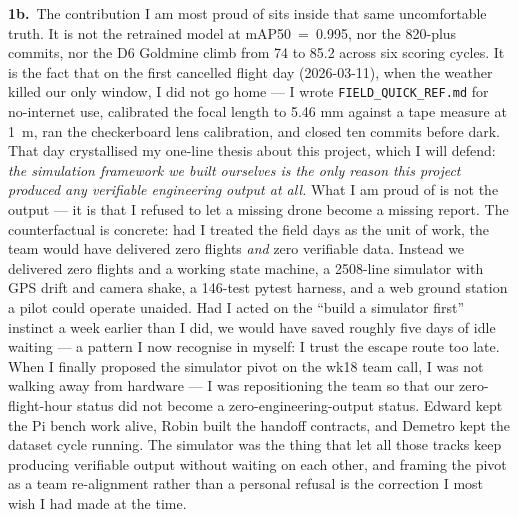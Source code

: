 \textbf{1b.}~The contribution I am most proud of sits inside that same uncomfortable truth. It is not the retrained model at mAP50~=~0.995, nor the 820-plus commits, nor the D6 Goldmine climb from 74 to 85.2 across six scoring cycles. It is the fact that on the first cancelled flight day (2026-03-11), when the weather killed our only window, I did not go home --- I wrote \texttt{FIELD\_QUICK\_REF.md} for no-internet use, calibrated the focal length to 5.46 mm against a tape measure at 1~m, ran the checkerboard lens calibration, and closed ten commits before dark. That day crystallised my one-line thesis about this project, which I will defend: \emph{the simulation framework we built ourselves is the only reason this project produced any verifiable engineering output at all.} What I am proud of is not the output --- it is that I refused to let a missing drone become a missing report. The counterfactual is concrete: had I treated the field days as the unit of work, the team would have delivered zero flights \emph{and} zero verifiable data. Instead we delivered zero flights and a working state machine, a 2508-line simulator with GPS drift and camera shake, a 146-test pytest harness, and a web ground station a pilot could operate unaided. Had I acted on the ``build a simulator first'' instinct a week earlier than I did, we would have saved roughly five days of idle waiting --- a pattern I now recognise in myself: I trust the escape route too late. When I finally proposed the simulator pivot on the wk18 team call, I was not walking away from hardware --- I was repositioning the team so that our zero-flight-hour status did not become a zero-engineering-output status. Edward kept the Pi bench work alive, Robin built the handoff contracts, and Demetro kept the dataset cycle running. The simulator was the thing that let all those tracks keep producing verifiable output without waiting on each other, and framing the pivot as a team re-alignment rather than a personal refusal is the correction I most wish I had made at the time.

